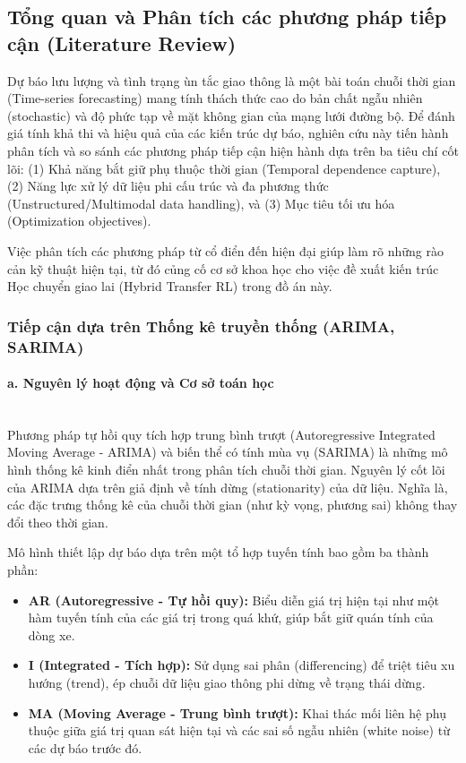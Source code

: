 \subsection{Tổng quan và Phân tích các phương pháp tiếp cận (Literature Review)}
\label{sec:5_1}

Dự báo lưu lượng và tình trạng ùn tắc giao thông là một bài toán chuỗi thời gian (Time-series forecasting) mang tính thách thức cao do bản chất ngẫu nhiên (stochastic) và độ phức tạp về mặt không gian của mạng lưới đường bộ. Để đánh giá tính khả thi và hiệu quả của các kiến trúc dự báo, nghiên cứu này tiến hành phân tích và so sánh các phương pháp tiếp cận hiện hành dựa trên ba tiêu chí cốt lõi: (1) Khả năng bắt giữ phụ thuộc thời gian (Temporal dependence capture), (2) Năng lực xử lý dữ liệu phi cấu trúc và đa phương thức (Unstructured/Multimodal data handling), và (3) Mục tiêu tối ưu hóa (Optimization objectives).

Việc phân tích các phương pháp từ cổ điển đến hiện đại giúp làm rõ những rào cản kỹ thuật hiện tại, từ đó củng cố cơ sở khoa học cho việc đề xuất kiến trúc Học chuyển giao lai (Hybrid Transfer RL) trong đồ án này.

\subsubsection{Tiếp cận dựa trên Thống kê truyền thống (ARIMA, SARIMA)}

\paragraph{a. Nguyên lý hoạt động và Cơ sở toán học} \mbox{} \\
Phương pháp tự hồi quy tích hợp trung bình trượt (Autoregressive Integrated Moving Average - ARIMA) và biến thể có tính mùa vụ (SARIMA) là những mô hình thống kê kinh điển nhất trong phân tích chuỗi thời gian. Nguyên lý cốt lõi của ARIMA dựa trên giả định về tính dừng (stationarity) của dữ liệu. Nghĩa là, các đặc trưng thống kê của chuỗi thời gian (như kỳ vọng, phương sai) không thay đổi theo thời gian.

Mô hình thiết lập dự báo dựa trên một tổ hợp tuyến tính bao gồm ba thành phần:
\begin{itemize}
    \item \textbf{AR (Autoregressive - Tự hồi quy):} Biểu diễn giá trị hiện tại như một hàm tuyến tính của các giá trị trong quá khứ, giúp bắt giữ quán tính của dòng xe.
    \item \textbf{I (Integrated - Tích hợp):} Sử dụng sai phân (differencing) để triệt tiêu xu hướng (trend), ép chuỗi dữ liệu giao thông phi dừng về trạng thái dừng.
    \item \textbf{MA (Moving Average - Trung bình trượt):} Khai thác mối liên hệ phụ thuộc giữa giá trị quan sát hiện tại và các sai số ngẫu nhiên (white noise) từ các dự báo trước đó.
\end{itemize}

